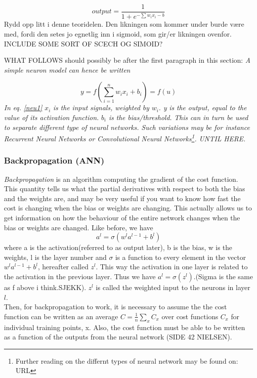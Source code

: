 \documentclass[a4paper,11pt,twocolumn]{article}
\begin{document}
\begin{equation}
output = \frac{1}{1 + e^{-\sum w_ix_i-b}}
\end{equation}
\cite{Nielsen}
Rydd opp litt i denne teoridelen. Den likningen som kommer under burde være med, fordi den setes jo egnetlig inn i sigmoid, som gir/er likningen ovenfor. 
INCLUDE SOME SORT OF SCECH OG SIMOID?


WHAT FOLLOWS should possibly be after the first paragraph in this section:
\textit{ A simple neuron model can hence be written} 

\begin{equation}
y = f(\sum\limits_{i=1}^n w_ix_i + b_i) = f(u)
\label{neu1}
\end{equation}
\cite{slides}
\textit{ In  eq. \eqref{neu1} $x_i$ is the input signals, weighted by $w_i$. y is the output, equal to the value of its activation function. $b_i$ is the bias/threshold. This can in turn be used to separate different type of neural networks. Such variations may be for instance Recurrent Neural Networks or Convolutional Neural Networks\footnote{Further reading on the differnt types of neural network may be found on: URL}. UNTIL HERE.}

\subsubsection{Backpropagation (ANN)}
\textit{Backpropagation} is an algorithm computing the gradient of the cost function. This quantity tells us what the partial derivatives with respect to both the bias and the weights are, and may be very useful if you want to know how fast the cost is changing when the bias or weights are changing. This actually allows us to get information on how the behaviour of the entire network changes when the bias or weights are changed. Like before, we have    
\begin{equation}
a^l = \sigma(w^la^{l-1} + b^l)
\label{al}
\end{equation}
where a is the activation(referred to as output later), b is the bias, w is the weights, l is the layer number and $\sigma$ is a function to every element in the vector $w^la^{l-1}+b^l$, hereafter called $z^l$. This way the activation in one layer is related to the activation in the previous layer. Thus we have $a^l = \sigma(z^l)$.(Sigma is the same as f above i think.SJEKK). $z^l$ is called the weighted input to the neurons in layer $l$. 
\\

Then, for backpropagation to work, it is necessary to assume the the cost function can be written as an average $C = \frac{1}{n}\sum_x C_x$ over cost functions $C_x$ for individual training points, x. Also, the cost function must be able to be written as a function of the outputs from the neural network (SIDE 42 NIELSEN). 
\\
\end{document}
